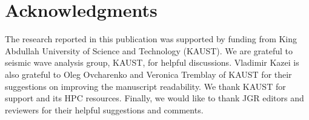 \section{Acknowledgments}
The research reported in this publication was supported by funding from King Abdullah University of Science and Technology (KAUST). We are grateful to seismic wave analysis group, KAUST, for helpful discussions. Vladimir Kazei is also grateful to Oleg Ovcharenko and Veronica Tremblay of KAUST for their suggestions on improving the manuscript readability. We thank KAUST for support and its HPC resources. Finally, we would like to thank JGR editors and reviewers for their helpful suggestions and comments.

